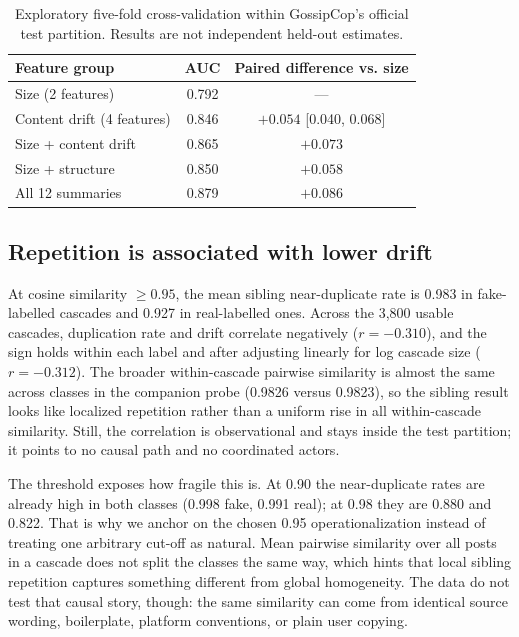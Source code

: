 \documentclass[conference]{IEEEtran}
\begin{document}
\begin{table}[t]
\caption{Exploratory five-fold cross-validation within GossipCop's official
test partition. Results are not independent held-out estimates.}
\label{tab:diagnostic}
\centering
\footnotesize
\begin{tabular}{lcc}
\toprule
Feature group & AUC & Paired difference vs. size \\
\midrule
Size (2 features) & 0.792 & --- \\
Content drift (4 features) & 0.846 & $+0.054$ [0.040, 0.068] \\
Size + content drift & 0.865 & $+0.073$ \\
Size + structure & 0.850 & $+0.058$ \\
All 12 summaries & 0.879 & $+0.086$ \\
\bottomrule
\end{tabular}
\end{table}

\subsection{Repetition is associated with lower drift}
At cosine similarity $\geq0.95$, the mean sibling near-duplicate rate is 0.983
in fake-labelled cascades and 0.927 in real-labelled ones. Across the 3,800
usable cascades, duplication rate and drift correlate negatively
($r=-0.310$), and the sign holds within each label and after adjusting linearly
for log cascade size ($r=-0.312$). The broader within-cascade pairwise
similarity is almost the same across classes in the companion probe (0.9826
versus 0.9823), so the sibling result looks like localized repetition rather
than a uniform rise in all within-cascade similarity. Still, the correlation is
observational and stays inside the test partition; it points to no causal path
and no coordinated actors.

The threshold exposes how fragile this is. At 0.90 the near-duplicate rates are
already high in both classes (0.998 fake, 0.991 real); at 0.98 they are 0.880
and 0.822. That is why we anchor on the chosen 0.95 operationalization instead
of treating one arbitrary cut-off as natural. Mean pairwise similarity over all
posts in a cascade does not split the classes the same way, which hints that
local sibling repetition captures something different from global homogeneity.
The data do not test that causal story, though: the same similarity can come
from identical source wording, boilerplate, platform conventions, or plain
user copying.
\end{document}
